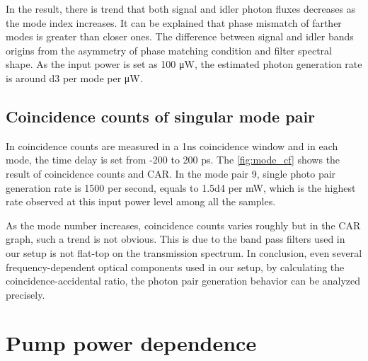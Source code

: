 In the result, there is trend that both signal and idler photon fluxes decreases as the mode index increases. It can be explained that phase mismatch of farther modes is greater than closer ones. The difference between signal and idler bands origins from the asymmetry of phase matching condition and filter spectral shape. As the input power is set as 100 \si{\micro\watt}, the estimated photon generation rate is around \num{d3} per mode per \si{\micro\watt}.

\begin{figure}
	\centering
	
	\label{fig:flux1}
\end{figure}


\subsection{Coincidence counts of singular mode pair}

In coincidence counts are measured in a 1ns coincidence window and in each mode, the time delay is set from -200 to 200 ps. The \autoref{fig:mode_cf} shows the result of coincidence counts and CAR. In the mode pair 9, single photo pair generation rate is 1500 per second, equals to \num{1.5d4} per mW, which is the highest rate observed at this input power level among all the samples.

As the mode number increases, coincidence counts varies roughly but in the CAR graph, such a trend is not obvious. This is due to the band pass filters used in our setup is not flat-top on the transmission spectrum. In conclusion, even several frequency-dependent optical components used in our setup, by calculating the coincidence-accidental ratio, the photon pair generation behavior can be analyzed precisely.

\begin{figure}
	\centering
	
	\label{fig:mode_cf}
\end{figure}

\section{Pump power dependence}

